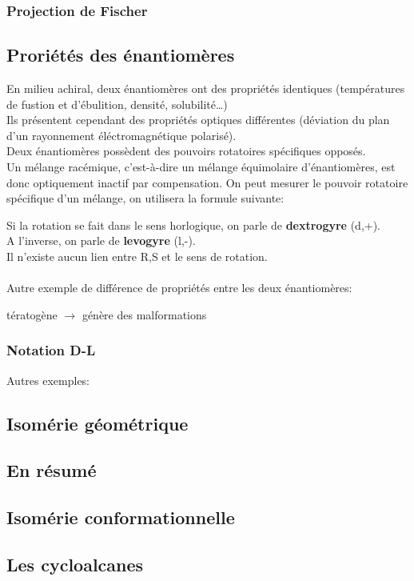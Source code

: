\documentclass{article}
\newcommand{\insertslide}[2]{
\begin{center}
    \fbox{\texttt{[image: \#1]}}
\end{center}
}
\begin{document}
        \subsubsection{Projection de Fischer}
            \insertslide{Slides/CM2.pdf}{35}

    \subsection{Proriétés des énantiomères}
        En milieu achiral, deux énantiomères ont des propriétés
        identiques (températures de fustion et d'ébulition,
        densité, solubilité…)\\
        Ils présentent cependant des propriétés optiques
        différentes (déviation du plan d’un rayonnement
        éléctromagnétique polarisé).\\
        Deux énantiomères possèdent des pouvoirs rotatoires
        spécifiques opposés.\\
        Un mélange racémique, c’est-à-dire un mélange
        équimolaire d’énantiomères, est donc optiquement
        inactif par compensation.
        On peut mesurer le pouvoir rotatoire spécifique d'un mélange,
        on utilisera la formule suivante:
        \insertslide{Slides/CM2.pdf}{38}
        Si la rotation se fait dans le sens horlogique, on parle de \textbf{dextrogyre} (d,+).\\
        A l'inverse, on parle de \textbf{levogyre} (l,-).\\
        Il n'existe aucun lien entre R,S et le sens de rotation.\\\\
        Autre exemple de différence de propriétés entre les deux énantiomères:
        \insertslide{Slides/CM2.pdf}{41}
        tératogène $\rightarrow$ génère des malformations

        \subsubsection{Notation D-L}
            \insertslide{Slides/CM2.pdf}{43}
            Autres exemples:
            \insertslide{Slides/CM2.pdf}{44}
            \insertslide{Slides/CM2.pdf}{45}

    \subsection{Isomérie géométrique}
        \insertslide{Slides/CM2.pdf}{46}
        \insertslide{Slides/CM2.pdf}{47}
        \insertslide{Slides/CM2.pdf}{48}
    
    \subsection{En résumé}
        \insertslide{Slides/CM2.pdf}{50}
        \insertslide{Slides/CM2.pdf}{51}
    \subsection{Isomérie conformationnelle}
    \subsection{Les cycloalcanes}
\end{document}
